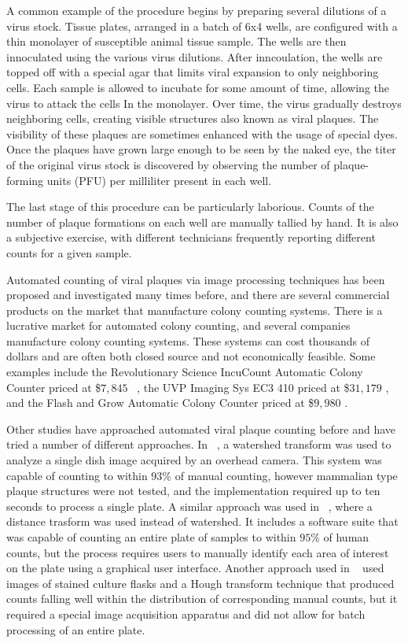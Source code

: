 \documentclass[11pt,final,twocolumn]{IEEEtran}
\begin{document}
A common example of the procedure begins by preparing several dilutions of a virus stock. Tissue plates, arranged in a batch of 6x4 wells, are configured with a thin monolayer of susceptible animal tissue sample.  The wells are then innoculated using the various virus dilutions. After inncoulation, the wells are topped off with a special agar that limits viral expansion to only neighboring cells. Each sample is allowed to incubate for some amount of time, allowing the virus to attack the cells In the monolayer. Over time, the virus gradually destroys neighboring cells, creating visible structures also known as viral plaques. The visibility of these plaques are sometimes enhanced with the usage of special dyes. Once the plaques have grown large enough to be seen by the naked eye, the titer of the original virus stock is discovered by observing the number of  plaque-forming units (PFU) per milliliter present in each well.

The last stage of this procedure can be particularly laborious. Counts of the number of plaque formations on each well are manually tallied by hand. It is also a subjective exercise, with different technicians frequently reporting different counts for a given sample.


Automated counting of viral plaques via image processing techniques  has been proposed and investigated many times before, and there are several commercial products on the market that manufacture colony counting systems. There is a lucrative market for automated colony counting, and several companies manufacture colony counting systems. These systems can cost thousands of dollars and are often both closed source and not economically feasible. Some examples include the Revolutionary Science IncuCount Automatic Colony Counter priced at \$$7,845$ ~\cite{labSafetySupply}, the UVP Imaging Sys EC3 410 priced at \$$31,179$ \cite{labPlanet}, and the Flash and Grow Automatic Colony Counter priced at \$$9,980$ \cite{coleParmer}. 

 Other studies have approached automated viral plaque counting before and have tried a number of different  approaches. In ~\cite{watershed}, a watershed transform was used to analyze a single dish image acquired by an overhead camera. This system was capable of counting to within $93$\% of
manual counting, however mammalian type plaque structures were not tested, and the implementation required up to ten seconds to process a single plate. A similar approach was used in ~\cite{distanceTransform}, where a distance trasform was used instead of watershed. It includes a software suite that was capable of counting an entire plate of samples to within $95$\% of human counts, but the process requires users to manually identify each area of interest on the plate using a graphical user interface.  Another approach used in ~\cite{houghTransform} used images of stained culture flasks and a Hough transform technique that produced counts falling well within the
distribution of corresponding manual counts, but it required a special image acquisition apparatus and did not allow for batch processing of an entire plate. 
\end{document}
